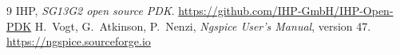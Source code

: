 \begin{thebibliography}{9}
 IHP, \emph{SG13G2 open source PDK}. \url{https://github.com/IHP-GmbH/IHP-Open-PDK}
 H.~Vogt, G.~Atkinson, P.~Nenzi, \emph{Ngspice User's Manual}, version 47.
  \url{https://ngspice.sourceforge.io}
\end{thebibliography}
